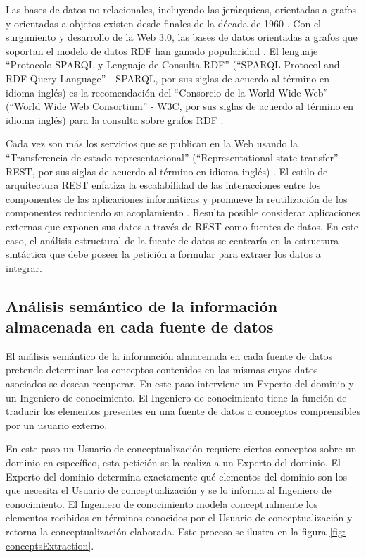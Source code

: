 Las bases de datos no relacionales, incluyendo las jerárquicas, orientadas a grafos y orientadas a objetos existen desde finales de la década de 1960 \citep{Leavitt2010}. Con el surgimiento y desarrollo de la Web 3.0, las bases de datos orientadas a grafos que soportan el modelo de datos RDF han ganado popularidad \citep{Zaki2017,BRISABOA2017106}. El lenguaje ``Protocolo SPARQL y Lenguaje de Consulta RDF'' (``SPARQL Protocol and RDF Query Language'' - SPARQL, por sus siglas de acuerdo al término en idioma inglés) es la recomendación del ``Consorcio de la World Wide Web'' (``World Wide Web Consortium'' - W3C, por sus siglas de acuerdo al término en idioma inglés) para la consulta sobre grafos RDF \citep{W3CSPARQLWorkingGroup2013}.

Cada vez son más los servicios que se publican en la Web usando la ``Transferencia de estado representacional'' (``Representational state transfer'' - REST, por sus siglas de acuerdo al término en idioma inglés) \citep{Pautasso2014}. El estilo de arquitectura REST enfatiza la escalabilidad de las interacciones entre los componentes de las aplicaciones informáticas y promueve la reutilización de los componentes reduciendo su acoplamiento \citep{Pautasso2014}. Resulta posible considerar aplicaciones externas que exponen sus datos a través de REST como fuentes de datos. En este caso, el análisis estructural de la fuente de datos se centraría en la estructura sintáctica que debe poseer la petición a formular para extraer los datos a integrar.

\subsection{Análisis semántico de la información almacenada en cada fuente de datos}

El análisis semántico de la información almacenada en cada fuente de datos pretende determinar los conceptos contenidos en las mismas cuyos datos asociados se desean recuperar. En este paso interviene un Experto del dominio y un Ingeniero de conocimiento. El Ingeniero de conocimiento tiene la función de traducir los elementos presentes en una fuente de datos a conceptos comprensibles por un usuario externo.

En este paso un Usuario de conceptualización requiere ciertos conceptos sobre un dominio en específico, esta petición se la realiza a un Experto del dominio. El Experto del dominio determina exactamente qué elementos del dominio son los que necesita el Usuario de conceptualización y se lo informa al Ingeniero de conocimiento. El Ingeniero de conocimiento modela conceptualmente los elementos recibidos en términos conocidos por el Usuario de conceptualización y retorna la conceptualización elaborada. Este proceso se ilustra en la figura \ref{fig: conceptsExtraction}.


